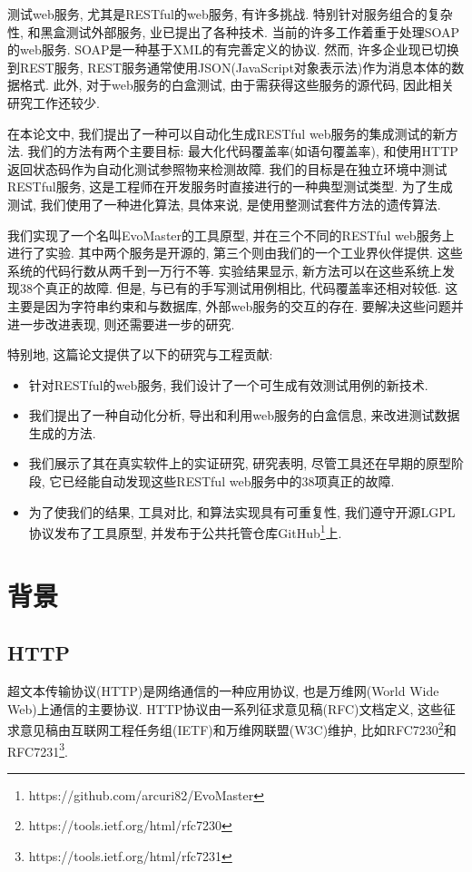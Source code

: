 测试web服务, 尤其是RESTful的web服务, 有许多挑战\cite{canfora2006service}\cite{bozkurt2013testing}. 特别针对服务组合的复杂性, 和黑盒测试外部服务, 业已提出了各种技术. 当前的许多工作着重于处理SOAP的web服务. SOAP是一种基于XML的有完善定义的协议. 然而, 许多企业现已切换到REST服务, REST服务通常使用JSON(JavaScript对象表示法)作为消息本体的数据格式. 此外, 对于web服务的白盒测试, 由于需获得这些服务的源代码, 因此相关研究工作还较少. 

在本论文中, 我们提出了一种可以自动化生成RESTful web服务的集成测试的新方法. 我们的方法有两个主要目标: 最大化代码覆盖率(如语句覆盖率), 和使用HTTP返回状态码作为自动化测试参照物来检测故障. 我们的目标是在独立环境中测试RESTful服务, 这是工程师在开发服务时直接进行的一种典型测试类型. 为了生成测试, 我们使用了一种进化算法, 具体来说, 是使用整测试套件方法的遗传算法\cite{fraser2013whole}. 

我们实现了一个名叫EvoMaster的工具原型, 并在三个不同的RESTful web服务上进行了实验. 其中两个服务是开源的, 第三个则由我们的一个工业界伙伴提供. 这些系统的代码行数从两千到一万行不等. 实验结果显示, 新方法可以在这些系统上发现38个真正的故障. 但是, 与已有的手写测试用例相比, 代码覆盖率还相对较低. 这主要是因为字符串约束和与数据库, 外部web服务的交互的存在. 要解决这些问题并进一步改进表现, 则还需要进一步的研究.

特别地, 这篇论文提供了以下的研究与工程贡献: 

\begin{itemize}
\item 针对RESTful的web服务, 我们设计了一个可生成有效测试用例的新技术.
\item 我们提出了一种自动化分析, 导出和利用web服务的白盒信息, 来改进测试数据生成的方法.
\item 我们展示了其在真实软件上的实证研究, 研究表明, 尽管工具还在早期的原型阶段, 它已经能自动发现这些RESTful web服务中的38项真正的故障.
\item 为了使我们的结果, 工具对比, 和算法实现具有可重复性, 我们遵守开源LGPL协议发布了工具原型, 并发布于公共托管仓库GitHub\footnote{https://github.com/arcuri82/EvoMaster}上.
\end{itemize}
  
\section{背景}
  \subsection{HTTP}
      超文本传输协议(HTTP)是网络通信的一种应用协议, 也是万维网(World Wide Web)上通信的主要协议. HTTP协议由一系列征求意见稿(RFC)文档定义, 这些征求意见稿由互联网工程任务组(IETF)和万维网联盟(W3C)维护, 比如RFC7230\footnote{https://tools.ietf.org/html/rfc7230}和RFC7231\footnote{https://tools.ietf.org/html/rfc7231}. 
        
